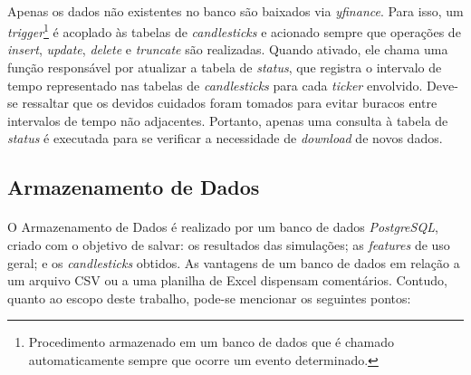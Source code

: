 
\paragraph{} Apenas os dados não existentes no banco são baixados via \textit{yfinance}. Para isso, um \textit{trigger}\footnote{Procedimento armazenado em um banco de dados que é chamado automaticamente sempre que ocorre um evento determinado.} é acoplado às tabelas de \textit{candlesticks} e acionado sempre que operações de \textit{insert}, \textit{update}, \textit{delete} e \textit{truncate} são realizadas. Quando ativado, ele chama uma função responsável por atualizar a tabela de \textit{status}, que registra o intervalo de tempo representado nas tabelas de \textit{candlesticks} para cada \textit{ticker} envolvido. Deve-se ressaltar que os devidos cuidados foram tomados para evitar buracos entre intervalos de tempo não adjacentes. Portanto, apenas uma consulta à tabela de \textit{status} é executada para se verificar a necessidade de \textit{download} de novos dados.



\FloatBarrier
\subsection{Armazenamento de Dados}

\paragraph{} O Armazenamento de Dados é realizado por um banco de dados \textit{PostgreSQL}, criado com o objetivo de salvar: os resultados das simulações; as \textit{features} de uso geral; e os \textit{candlesticks} obtidos. As vantagens de um banco de dados em relação a um arquivo CSV ou a uma planilha de Excel dispensam comentários. Contudo, quanto ao escopo deste trabalho, pode-se mencionar os seguintes pontos:

